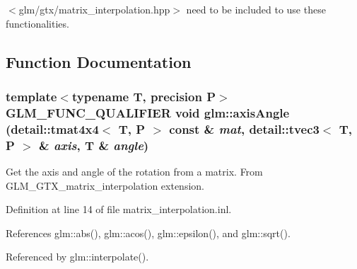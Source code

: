 $<$glm/gtx/matrix\_\-interpolation.hpp$>$ need to be included to use these functionalities. 

\subsection{Function Documentation}
\hypertarget{group__gtx__matrix__interpolation_g16474d44af6a32a07c50df2409526d95}{
\subsubsection[axisAngle]{\setlength{\rightskip}{0pt plus 5cm}template$<$typename T, precision P$>$ GLM\_\-FUNC\_\-QUALIFIER void glm::axisAngle (detail::tmat4x4$<$ T, P $>$ const \& {\em mat}, \/  detail::tvec3$<$ T, P $>$ \& {\em axis}, \/  T \& {\em angle})}}
\label{group__gtx__matrix__interpolation_g16474d44af6a32a07c50df2409526d95}


Get the axis and angle of the rotation from a matrix. From GLM\_\-GTX\_\-matrix\_\-interpolation extension. 

Definition at line 14 of file matrix\_\-interpolation.inl.

References glm::abs(), glm::acos(), glm::epsilon(), and glm::sqrt().

Referenced by glm::interpolate().

